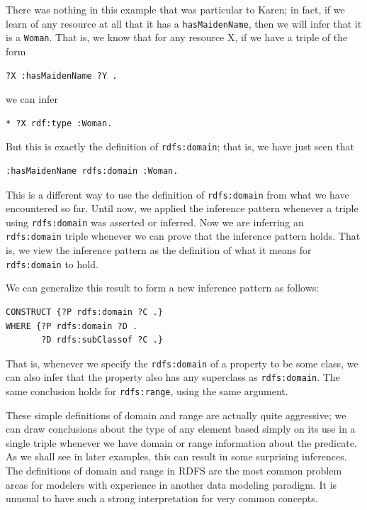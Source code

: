 There was nothing in this example that was particular to Karen; in fact,
if we learn of any resource at all that it has a \texttt{hasMaidenName}, then we
will infer that it is a \texttt{Woman}. That is, we know that for any resource X,
if we have a triple of the form

\begin{lstlisting}
?X :hasMaidenName ?Y .
\end{lstlisting}

we can infer

\begin{lstlisting}
* ?X rdf:type :Woman.
\end{lstlisting}

But this is exactly the definition of \texttt{rdfs:domain}; that is, we have just
seen that

\begin{lstlisting}
:hasMaidenName rdfs:domain :Woman.
\end{lstlisting}

This is a different way to use the definition of \texttt{rdfs:domain} from what
we have encountered so far. Until now, we applied the inference pattern
whenever a triple using \texttt{rdfs:domain} was asserted or inferred. Now we are
inferring an \texttt{rdfs:domain} triple whenever we can prove that the inference
pattern holds. That is, we view the inference pattern as the definition
of what it means for \texttt{rdfs:domain} to hold.

We can generalize this result to form a new inference pattern as
follows:

\begin{lstlisting}
CONSTRUCT {?P rdfs:domain ?C .}
WHERE {?P rdfs:domain ?D .
       ?D rdfs:subClassof ?C .}
\end{lstlisting}

That is, whenever we specify the \texttt{rdfs:domain} of a property to be some
class, we can also infer that the property also has any superclass as
\texttt{rdfs:domain}. The same conclusion holds for \texttt{rdfs:range}, using the same
argument.

These simple definitions of domain and range are actually quite
aggressive; we can draw conclusions about the type of any element based
simply on its use in a single triple whenever we have domain or range
information about the predicate. As we shall see in later examples, this
can result in some surprising inferences. The definitions of domain and
range in RDFS are the most common problem areas for modelers with
experience in another data modeling paradigm. It is unusual to have such
a strong interpretation for very common concepts.

